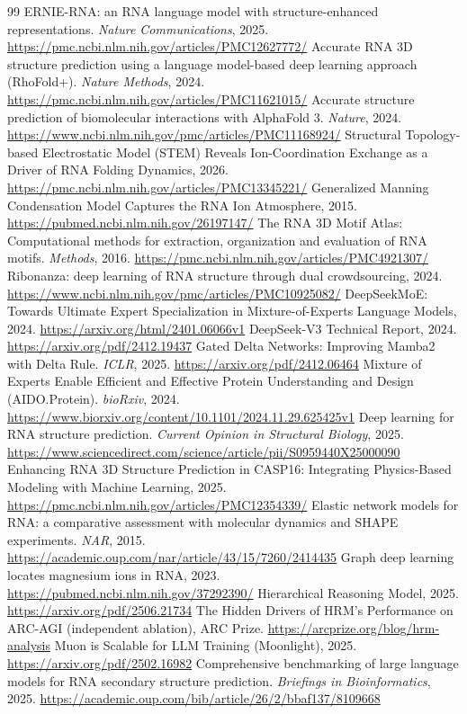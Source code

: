 \documentclass[11pt,a4paper]{article}
\begin{document}
\begin{thebibliography}{99}
\small
{} ERNIE-RNA: an RNA language model with structure-enhanced
representations. \emph{Nature Communications}, 2025.
\url{https://pmc.ncbi.nlm.nih.gov/articles/PMC12627772/}
 Accurate RNA 3D structure prediction using a language
model-based deep learning approach (RhoFold+). \emph{Nature Methods}, 2024.
\url{https://pmc.ncbi.nlm.nih.gov/articles/PMC11621015/}
 Accurate structure prediction of biomolecular interactions with
AlphaFold 3. \emph{Nature}, 2024.
\url{https://www.ncbi.nlm.nih.gov/pmc/articles/PMC11168924/}
 Structural Topology-based Electrostatic Model (STEM) Reveals
Ion-Coordination Exchange as a Driver of RNA Folding Dynamics, 2026.
\url{https://pmc.ncbi.nlm.nih.gov/articles/PMC13345221/}
 Generalized Manning Condensation Model Captures the RNA Ion
Atmosphere, 2015. \url{https://pubmed.ncbi.nlm.nih.gov/26197147/}
 The RNA 3D Motif Atlas: Computational methods for extraction,
organization and evaluation of RNA motifs. \emph{Methods}, 2016.
\url{https://pmc.ncbi.nlm.nih.gov/articles/PMC4921307/}
 Ribonanza: deep learning of RNA structure through dual
crowdsourcing, 2024.
\url{https://www.ncbi.nlm.nih.gov/pmc/articles/PMC10925082/}
 DeepSeekMoE: Towards Ultimate Expert Specialization in
Mixture-of-Experts Language Models, 2024.
\url{https://arxiv.org/html/2401.06066v1}
 DeepSeek-V3 Technical Report, 2024.
\url{https://arxiv.org/pdf/2412.19437}
 Gated Delta Networks: Improving Mamba2 with Delta Rule.
\emph{ICLR}, 2025. \url{https://arxiv.org/pdf/2412.06464}
 Mixture of Experts Enable Efficient and Effective Protein
Understanding and Design (AIDO.Protein). \emph{bioRxiv}, 2024.
\url{https://www.biorxiv.org/content/10.1101/2024.11.29.625425v1}
 Deep learning for RNA structure prediction.
\emph{Current Opinion in Structural Biology}, 2025.
\url{https://www.sciencedirect.com/science/article/pii/S0959440X25000090}
 Enhancing RNA 3D Structure Prediction in CASP16: Integrating
Physics-Based Modeling with Machine Learning, 2025.
\url{https://pmc.ncbi.nlm.nih.gov/articles/PMC12354339/}
 Elastic network models for RNA: a comparative assessment with
molecular dynamics and SHAPE experiments. \emph{NAR}, 2015.
\url{https://academic.oup.com/nar/article/43/15/7260/2414435}
 Graph deep learning locates magnesium ions in RNA, 2023.
\url{https://pubmed.ncbi.nlm.nih.gov/37292390/}
 Hierarchical Reasoning Model, 2025.
\url{https://arxiv.org/pdf/2506.21734}
 The Hidden Drivers of HRM's Performance on ARC-AGI
(independent ablation), ARC Prize. \url{https://arcprize.org/blog/hrm-analysis}
 Muon is Scalable for LLM Training (Moonlight), 2025.
\url{https://arxiv.org/pdf/2502.16982}
 Comprehensive benchmarking of large language models for RNA
secondary structure prediction. \emph{Briefings in Bioinformatics}, 2025.
\url{https://academic.oup.com/bib/article/26/2/bbaf137/8109668}
\end{thebibliography}
\end{document}
